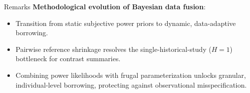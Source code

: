 \documentclass[t]{beamer}
\begin{document}
\begin{frame}{Remarks}
    \vspace{1.3cm}
    \textbf{Methodological evolution of Bayesian data fusion}:
    \begin{itemize}
        \setlength{\itemsep}{0.12cm}
        \item Transition from static subjective power priors to dynamic, data-adaptive borrowing.
        \item Pairwise reference shrinkage resolves the single-historical-study ($H=1$) bottleneck for contrast summaries.
        \item Combining power likelihoods with frugal parameterization unlocks granular, individual-level borrowing, protecting against observational misspecification.
    \end{itemize}

\end{frame}
\end{document}

